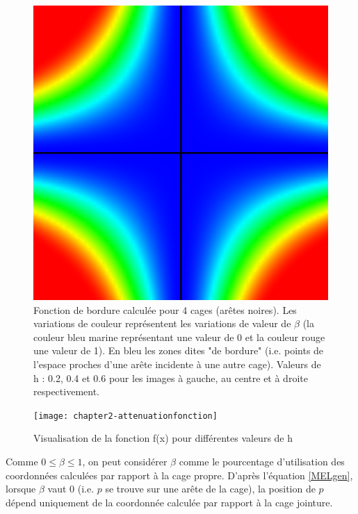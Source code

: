 \begin{figure}[ht]
\begin{center}
    \includegraphics[scale=0.35]{starCage-0-6}
    \caption{Fonction de bordure calculée pour 4 cages (arêtes
      noires). Les variations de couleur représentent les variations
      de valeur de $\beta$ (la couleur bleu marine représentant une
      valeur de 0 et la couleur rouge une valeur de 1). En bleu les
      zones dites "de bordure" (i.e. points de l'espace proches d'une
      arête incidente à une autre cage). Valeurs de h : 0.2, 0.4 et
      0.6 pour les images à gauche, au centre et à droite
      respectivement.}
    \label{MELpar}
  \end{center}
\end{figure}

\begin{figure}[ht]
  \begin{center}
    \texttt{[image: chapter2-attenuationfonction]}
    \caption{Visualisation de la fonction f(x) pour différentes
      valeurs de h}
    \label{MELfon}
  \end{center}
\end{figure}

Comme $0 \leq \beta \leq 1$, on peut considérer $\beta$ comme le
pourcentage d'utilisation des coordonnées calculées par rapport à la
cage propre. D'après l'équation \ref{MELgen}, lorsque $\beta$ vaut 0
(i.e. $p$ se trouve sur une arête de la cage), la position de $p$
dépend uniquement de la coordonnée calculée par rapport à la cage
jointure.

